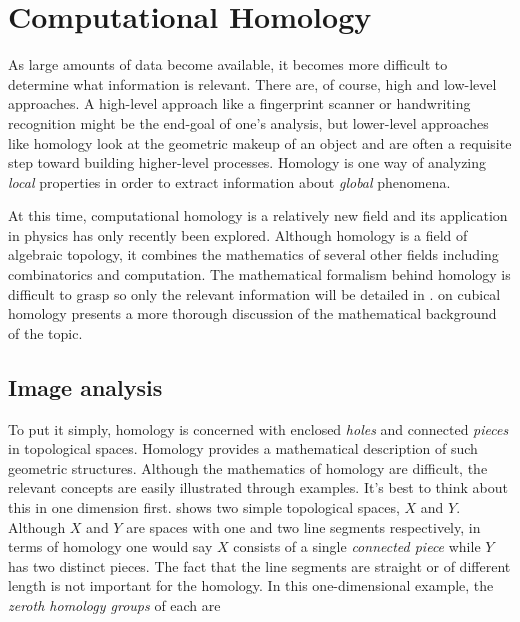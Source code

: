 \chapter{Computational Homology} \label{ch:homology}

As large amounts of data become available, it becomes more difficult to determine what information is relevant. There are, of course, high and low-level approaches. A high-level approach like a fingerprint scanner or handwriting recognition might be the end-goal of one's analysis, but lower-level approaches like homology look at the geometric makeup of an object and are often a requisite step toward building higher-level processes. Homology is one way of analyzing \textit{local} properties in order to extract information about \textit{global} phenomena.

	At this time, computational homology is a relatively new field and its application in physics has only recently been explored. Although homology is a field of algebraic topology, it combines the mathematics of several other fields including combinatorics and computation. The mathematical formalism behind homology is difficult to grasp so only the relevant information will be detailed in .  on cubical homology presents a more thorough discussion of the mathematical background of the topic.
		
\section{Image analysis} \label{ch2:imageanalysis}

To put it simply, homology is concerned with enclosed \textit{holes} and connected \textit{pieces} in topological spaces. Homology provides a mathematical description of such geometric structures. Although the mathematics of homology are difficult, the relevant concepts are easily illustrated through examples. It's best to think about this in one dimension first.  shows two simple topological spaces, $X$ and $Y$. Although $X$ and $Y$ are spaces with one and two line segments respectively, in terms of homology one would say $X$ consists of a single \textit{connected piece} while $Y$ has two distinct pieces. The fact that the line segments are straight or of different length is not important for the homology. In this one-dimensional example, the \textit{zeroth homology groups} of each are

